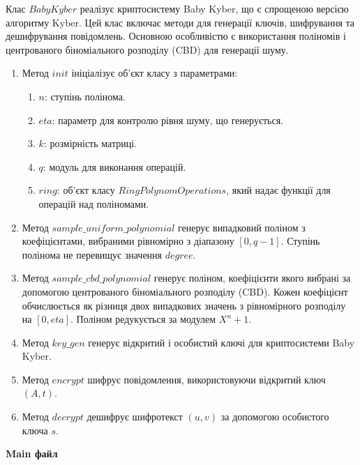 Клас $BabyKyber$ реалізує криптосистему Baby Kyber, що є спрощеною версією алгоритму Kyber. Цей клас включає методи для генерації ключів, шифрування та дешифрування повідомлень. Основною особливістю є використання поліномів і центрованого біноміального розподілу (CBD) для генерації шуму.
\begin{enumerate}
    \item Метод $init$ ініціалізує об'єкт класу з параметрами:
    \begin{enumerate}
        \item $n$: ступінь полінома.
        \item $eta$: параметр для контролю рівня шуму, що генерується.
        \item $k$: розмірність матриці.
        \item $q$: модуль для виконання операцій.
        \item $ring$: об'єкт класу $RingPolynomOperations$, який надає функції для операцій над поліномами.
    \end{enumerate}

    \item Метод $sample\_uniform\_polynomial$ генерує випадковий поліном з коефіцієнтами, вибраними рівномірно з діапазону $[0, q-1]$. Ступінь полінома не перевищує значення $degree$.

    \item Метод $sample\_cbd\_polynomial$ генерує поліном, коефіцієнти якого вибрані за допомогою центрованого біноміального розподілу (CBD). Кожен коефіцієнт обчислюється як різниця двох випадкових значень з рівномірного розподілу на $[0, eta]$. Поліном редукується за модулем $X^n + 1$.
    
    \item Метод $key\_gen$ генерує відкритий і особистий ключі для криптосистеми Baby Kyber.

    \item Метод $encrypt$ шифрує повідомлення, використовуючи відкритий ключ $(A,t)$.
    
     \item Метод $decrypt$ дешифрує шифротекст $(u,v)$ за допомогою особистого ключа $s$.

\end{enumerate}

\textbf{Main файл}

